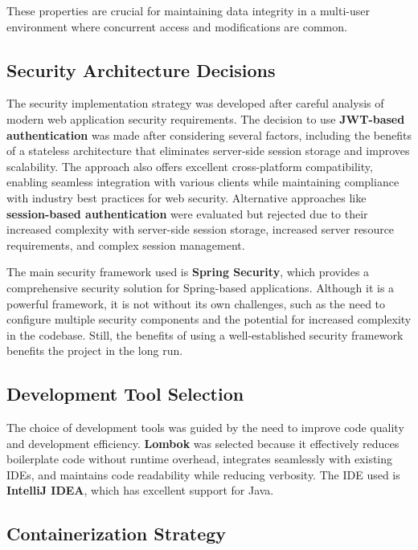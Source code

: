 These properties are crucial for maintaining data integrity in a multi-user environment where concurrent access and modifications are common.

\subsection{Security Architecture Decisions}\label{subsec:security-decisions}

The security implementation strategy was developed after careful analysis of modern web application security requirements.
The decision to use \textbf{JWT-based authentication} was made after considering several factors, including the benefits of a stateless architecture that eliminates server-side session storage and improves scalability.
The approach also offers excellent cross-platform compatibility, enabling seamless integration with various clients while maintaining compliance with industry best practices for web security.
Alternative approaches like \textbf{session-based authentication} were evaluated but rejected due to their increased complexity with server-side session storage, increased server resource requirements, and complex session management.


The main security framework used is \textbf{Spring Security}, which provides a comprehensive security solution for Spring-based applications.
Although it is a powerful framework, it is not without its own challenges, such as the need to configure multiple security components and the potential for increased complexity in the codebase.
Still, the benefits of using a well-established security framework benefits the project in the long run.
\subsection{Development Tool Selection}\label{subsec:tool-selection}

The choice of development tools was guided by the need to improve code quality and development efficiency.
\textbf{Lombok} was selected because it effectively reduces boilerplate code without runtime overhead, integrates seamlessly with existing IDEs, and maintains code readability while reducing verbosity.
The IDE used is \textbf{IntelliJ IDEA}, which has excellent support for Java.

\subsection{Containerization Strategy}\label{subsec:containerization}

